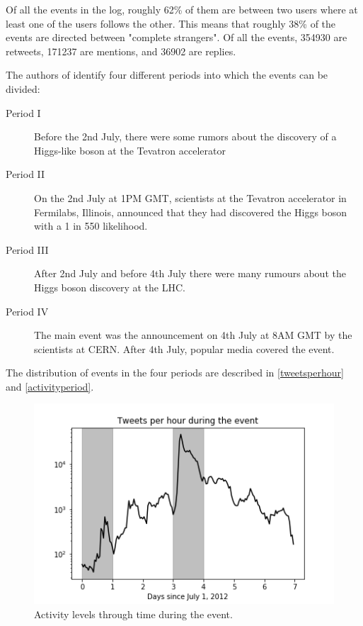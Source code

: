 \documentclass[sigconf]{acmart}
\begin{document}
Of all the events in the log, roughly 62\% of them are between two users where at least one of the users follows the other. This means that roughly 38\% of the events are directed between "complete strangers". Of all the events, 354930 are retweets, 171237 are mentions, and 36902 are replies. 

The authors of \cite{de2013anatomy} identify four different periods into which the events can be divided:

\begin{description}
\item[Period I] Before the 2nd July, there were some rumors about the discovery of a Higgs-like boson at the Tevatron accelerator
\item[Period II] On the 2nd July at 1PM GMT, scientists at the Tevatron accelerator in Fermilabs, Illinois, announced that they had discovered the Higgs boson with a 1 in 550 likelihood. 
\item[Period III] After 2nd July and before 4th July there were many rumours about the Higgs boson discovery at the LHC. 
\item[Period IV] The main event was the announcement on 4th July at 8AM GMT by the scientists at CERN. After 4th July, popular media covered the event. 
\end{description}

The distribution of events in the four periods are described in \autoref{tweetsperhour} and \autoref{activityperiod}. 

\begin{figure}[htbp]
\begin{center}
\includegraphics[width=\linewidth]{Figures/tweetsperhour.png}
\caption{Activity levels through time during the event.}
\label{tweetsperhour}
\end{center}
\end{figure}
\end{document}
